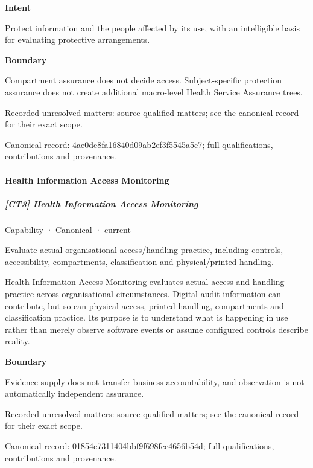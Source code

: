 \textbf{Intent}



Protect information and the people affected by its use, with an intelligible basis for evaluating protective arrangements.



\textbf{Boundary}



Compartment assurance does not decide access. Subject-specific protection assurance does not create additional macro-level Health Service Assurance trees.


{\small Recorded unresolved matters: source-qualified matters; see the canonical record for their exact scope.}\par
{\footnotesize \href{../../../../continuum/strategy/capability/4ae0de8fa16840d09ab2ef3f5545a5e7.md}{Canonical record: 4ae0de8fa16840d09ab2ef3f5545a5e7}; full qualifications, contributions and provenance.}\par
\paragraph{Health Information Access Monitoring}

\subparagraph{[CT3] Health Information Access Monitoring}

\label{element:01854c7311404bbf9f698fce4656b54d}
{\small Capability · Canonical · current}\par

Evaluate actual organisational access/handling practice, including controls, accessibility, compartments, classification and physical/printed handling.



Health Information Access Monitoring evaluates actual access and handling practice across organisational circumstances. Digital audit information can contribute, but so can physical access, printed handling, compartments and classification practice. Its purpose is to understand what is happening in use rather than merely observe software events or assume configured controls describe reality.



\textbf{Boundary}



Evidence supply does not transfer business accountability, and observation is not automatically independent assurance.


{\small Recorded unresolved matters: source-qualified matters; see the canonical record for their exact scope.}\par
{\footnotesize \href{../../../../continuum/strategy/capability/01854c7311404bbf9f698fce4656b54d.md}{Canonical record: 01854c7311404bbf9f698fce4656b54d}; full qualifications, contributions and provenance.}\par
